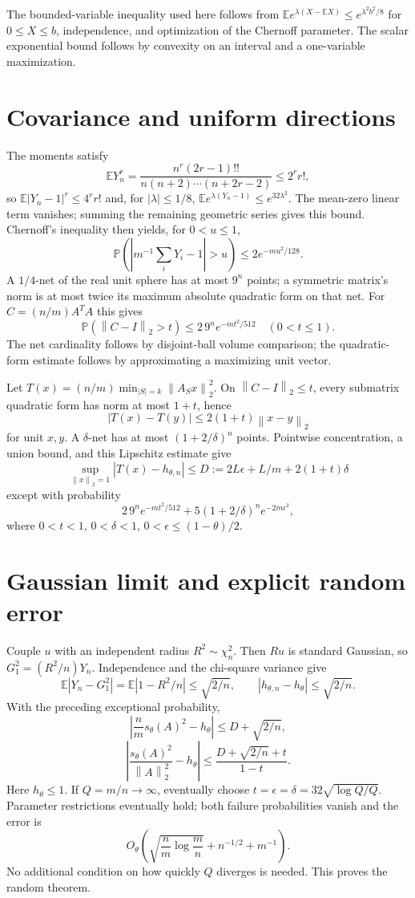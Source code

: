 \documentclass[11pt]{article}
\newcommand{\norm}[1]{\left\lVert#1\right\rVert}
\newcommand{\E}{\mathbb E}
\newcommand{\Prob}{\mathbb P}
\begin{document}
The bounded-variable inequality used here follows from $\E e^{\lambda(X-\E X)}\le e^{\lambda^2b^2/8}$ for $0\le X\le b$, independence, and optimization of the Chernoff parameter. The scalar exponential bound follows by convexity on an interval and a one-variable maximization.
\section{Covariance and uniform directions}
The moments satisfy
\[
\E Y_n^r=\frac{n^r(2r-1)!!}{n(n+2)\cdots(n+2r-2)}\le2^r r!,
\]
so $\E|Y_n-1|^r\le4^r r!$ and, for $|\lambda|\le1/8$, $\E e^{\lambda(Y_n-1)}\le e^{32\lambda^2}$. The mean-zero linear term vanishes; summing the remaining geometric series gives this bound. Chernoff's inequality then yields, for $0<u\le1$,
\[
\Prob\left(\left|m^{-1}\sum_iY_i-1\right|>u\right)\le2e^{-mu^2/128}.
\]
A $1/4$-net of the real unit sphere has at most $9^n$ points; a symmetric matrix's norm is at most twice its maximum absolute quadratic form on that net. For $C=(n/m)A^TA$ this gives
\[\Prob(\norm{C-I}_2>t)\le2\,9^n e^{-mt^2/512}\quad(0<t\le1).\]
The net cardinality follows by disjoint-ball volume comparison; the quadratic-form estimate follows by approximating a maximizing unit vector.

Let $T(x)=(n/m)\min_{|S|=k}\norm{A_Sx}_2^2$. On $\norm{C-I}_2\le t$, every submatrix quadratic form has norm at most $1+t$, hence
\[|T(x)-T(y)|\le2(1+t)\norm{x-y}_2\]
for unit $x,y$. A $\delta$-net has at most $(1+2/\delta)^n$ points. Pointwise concentration, a union bound, and this Lipschitz estimate give
\[
\sup_{\norm x_2=1}|T(x)-h_{\theta,n}|\le D:=2L\epsilon+L/m+2(1+t)\delta
\]
except with probability
\[
2\,9^n e^{-mt^2/512}+5(1+2/\delta)^n e^{-2m\epsilon^2},
\]
where $0<t<1$, $0<\delta<1$, $0<\epsilon\le(1-\theta)/2$.
\section{Gaussian limit and explicit random error}
Couple $u$ with an independent radius $R^2\sim\chi_n^2$. Then $Ru$ is standard Gaussian, so $G_1^2=(R^2/n)Y_n$. Independence and the chi-square variance give
\[
\E|Y_n-G_1^2|=\E|1-R^2/n|\le\sqrt{2/n},\qquad
|h_{\theta,n}-h_\theta|\le\sqrt{2/n}.
\]
With the preceding exceptional probability,
\[
\left|\frac nm s_\theta(A)^2-h_\theta\right|\le D+\sqrt{2/n},
\]
\[
\left|\frac{s_\theta(A)^2}{\norm A_2^2}-h_\theta\right|
\le\frac{D+\sqrt{2/n}+t}{1-t}.
\]
Here $h_\theta\le1$. If $Q=m/n\to\infty$, eventually choose $t=\epsilon=\delta=32\sqrt{\log Q/Q}$. Parameter restrictions eventually hold; both failure probabilities vanish and the error is
\[
O_\theta\left(\sqrt{\frac nm\log\frac mn}+n^{-1/2}+m^{-1}\right).
\]
No additional condition on how quickly $Q$ diverges is needed. This proves the random theorem.
\end{document}
